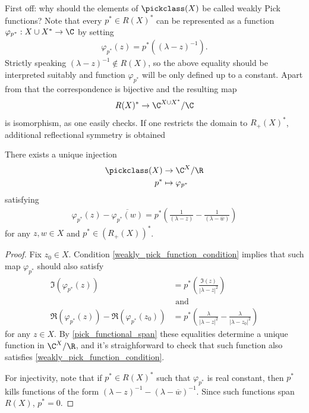 First off: why should the elements of $\pickclass(X)$ be called weakly Pick functions? Note that every $p^{*} \in R(X)^{*}$ can be represented as a function $\varphi_{p^{*}} : X \cup X^{*} \to \C$ by setting
\begin{align*}
	\varphi_{p^{*}}(z) = p^{*}((\lambda - z)^{-1}).
\end{align*}
Strictly speaking $(\lambda - z)^{-1} \notin R(X)$, so the above equality should be interpreted suitably and function $\varphi_{p^{*}}$ will be only defined up to a constant. Apart from that the correspondence is bijective and the resulting map
\begin{align*}
	R(X)^{*} \to \C^{X \cup X^{*}}/\C
\end{align*}
is isomorphism, as one easily checks. If one restricts the domain to $R_{+}(X)^{*}$, additional reflectional symmetry is obtained
\begin{lem}\label{weakly_pick_nonsense}
	There exists a unique injection
	\begin{align*}
		\pickclass(X) &\to \C^{X}/\R \\
		p^{*} &\mapsto \varphi_{p^{*}}
	\end{align*}
	satisfying
	\begin{align}\label{weakly_pick_function_condition}
		\varphi_{p^{*}}(z) - \overline{\varphi_{p^{*}}(w)} = p^{*}\left(\frac{1}{(\lambda - z)} -\frac{1}{(\lambda - \overline{w})}\right)
	\end{align}
	for any $z, w \in X$ and $p^{*} \in (R_{+}(X))^{*}$.
\end{lem}
\begin{proof}
	Fix $z_{0} \in X$. Condition \ref{weakly_pick_function_condition} implies that such map $\varphi_{p^{*}}$ should also satisfy
	\begin{align}\label{weakly_pick_condition_2}
		\Im(\varphi_{p^{*}}(z)) &= p^{*}\left(\frac{\Im(z)}{|\lambda - z|^{2}}\right) \nonumber\\
		&\text{ and } \\
		\Re(\varphi_{p^{*}}(z)) - \Re(\varphi_{p^{*}}(z_{0})) &= p^{*}\left(\frac{\lambda}{|\lambda - z|^2} - \frac{\lambda}{|\lambda - z_{0}|^2}\right) \nonumber
	\end{align}
	for any $z \in X$. By \ref{pick_functional_span} these equalities determine a unique function in $\C^{X}/\R$, and it's straighforward to check that such function also satisfies \ref{weakly_pick_function_condition}.

	For injectivity, note that if $p^{*} \in R(X)^{*}$ such that $\varphi_{p^{*}}$ is real constant, then $p^{*}$ kills functions of the form $(\lambda - z)^{-1} -(\lambda - \overline{w})^{-1}$. Since such functions span $R(X)$, $p^{*} = 0$. 
\end{proof}

